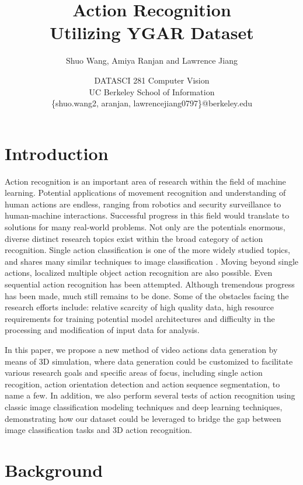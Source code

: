 \documentclass[
	a4paper, %
	10pt, %
	unnumberedsections, %
	twoside, %
]{t0004}
\title{Action Recognition\\ Utilizing YGAR Dataset} %
\author{
	Shuo Wang, Amiya Ranjan and Lawrence Jiang
}
\date{\footnotesize DATASCI 281 Computer Vision \\ UC Berkeley School of Information \\ \{shuo.wang2, aranjan, lawrencejiang0797\}@berkeley.edu}
\begin{document}
\maketitle %


\section{Introduction}

Action recognition is an important area of research within the field of machine learning. Potential applications of movement recognition and understanding of human actions are endless, ranging from robotics and security surveillance to human-machine interactions. Successful progress in this field would translate to solutions for many real-world problems. Not only are the potentials enormous, diverse distinct research topics exist within the broad category of action recognition. Single action classification\cite{Carreira:2018qr} is one of the more widely studied topics, and shares many similar techniques to image classification \cite{Ren:2015qr}. Moving beyond single actions, localized multiple object action recognition are also possible\cite{Wu:2023qr, Gu:2018qr}. Even sequential action recognition has been attempted\cite{Yeung:2017qr}. Although tremendous progress has been made, much still remains to be done. Some of the obstacles facing the research efforts include: relative scarcity of high quality data\cite{Carreira:2018qr}, high resource requirements for training potential model architectures and difficulty in the processing and modification of input data for analysis.

In this paper, we propose a new method of video actions data generation by means of 3D simulation, where data generation could be customized to facilitate various research goals and specific areas of focus, including single action recogition, action orientation detection and action sequence segmentation, to name a few. In addition, we also perform several tests of action recognition using classic image classification modeling techniques and deep learning techniques, demonstrating how our dataset could be leveraged to bridge the gap between image classification tasks and 3D action recognition.

\section{Background}
\end{document}
